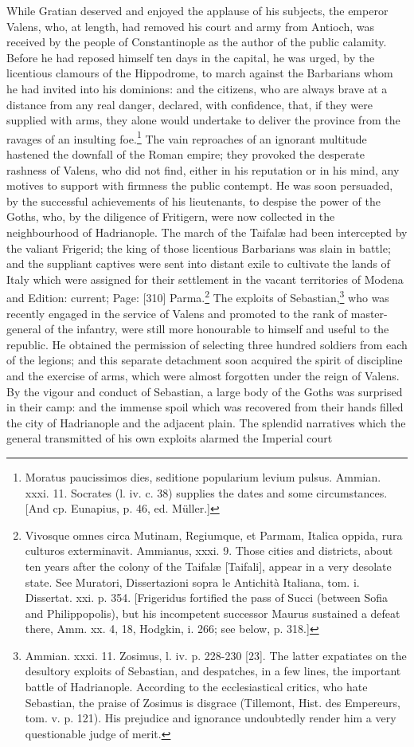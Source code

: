 While Gratian deserved and enjoyed the applause of his subjects, the emperor Valens, who, at length, had removed his court and army from Antioch, was received by the people of Constantinople as the author of the public calamity. Before he had reposed himself ten days in the capital, he was urged, by the licentious clamours of the Hippodrome, to march against the Barbarians whom he had invited into his dominions: and the citizens, who are always brave at a distance from any real danger, declared, with confidence, that, if they were supplied with arms, they alone would undertake to deliver the province from the ravages of an insulting foe.\footnote{Moratus paucissimos dies, seditione popularium levium pulsus. Ammian. xxxi. 11. Socrates (l. iv. c. 38) supplies the dates and some circumstances. [And cp. Eunapius, p. 46, ed. Müller.]} The vain reproaches of an ignorant multitude hastened the downfall of the Roman empire; they provoked the desperate rashness of Valens, who did not find, either in his reputation or in his mind, any motives to support with firmness the public contempt. He was soon persuaded, by the successful achievements of his lieutenants, to despise the power of the Goths, who, by the diligence of Fritigern, were now collected in the neighbourhood of Hadrianople. The march of the Taifalæ had been intercepted by the valiant Frigerid; the king of those licentious Barbarians was slain in battle; and the suppliant captives were sent into distant exile to cultivate the lands of Italy which were assigned for their settlement in the vacant territories of Modena and Edition: current; Page: [310] Parma.\footnote{Vivosque omnes circa Mutinam, Regiumque, et Parmam, Italica oppida, rura culturos exterminavit. Ammianus, xxxi. 9. Those cities and districts, about ten years after the colony of the Taifalæ [Taifali], appear in a very desolate state. See Muratori, Dissertazioni sopra le Antichità Italiana, tom. i. Dissertat. xxi. p. 354. [Frigeridus fortified the pass of Succi (between Sofia and Philippopolis), but his incompetent successor Maurus sustained a defeat there, Amm. xx. 4, 18, Hodgkin, i. 266; see below, p. 318.]} The exploits of Sebastian,\footnote{Ammian. xxxi. 11. Zosimus, l. iv. p. 228-230 [23]. The latter expatiates on the desultory exploits of Sebastian, and despatches, in a few lines, the important battle of Hadrianople. According to the ecclesiastical critics, who hate Sebastian, the praise of Zosimus is disgrace (Tillemont, Hist. des Empereurs, tom. v. p. 121). His prejudice and ignorance undoubtedly render him a very questionable judge of merit.} who was recently engaged in the service of Valens and promoted to the rank of master-general of the infantry, were still more honourable to himself and useful to the republic. He obtained the permission of selecting three hundred soldiers from each of the legions; and this separate detachment soon acquired the spirit of discipline and the exercise of arms, which were almost forgotten under the reign of Valens. By the vigour and conduct of Sebastian, a large body of the Goths was surprised in their camp: and the immense spoil which was recovered from their hands filled the city of Hadrianople and the adjacent plain. The splendid narratives which the general transmitted of his own exploits alarmed the Imperial court 